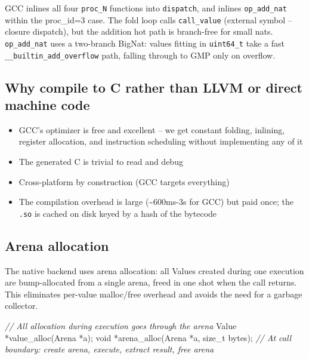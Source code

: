 \documentclass[]{article}
\newenvironment{Shaded}{}{}
\newcommand{\CommentTok}[1]{\textcolor[rgb]{0.38,0.63,0.69}{\textit{#1}}}
\newcommand{\DataTypeTok}[1]{\textcolor[rgb]{0.56,0.13,0.00}{#1}}
\newcommand{\NormalTok}[1]{#1}
\newcommand{\OperatorTok}[1]{\textcolor[rgb]{0.40,0.40,0.40}{#1}}
\begin{document}
GCC inlines all four \texttt{proc\_N} functions into \texttt{dispatch}, and
inlines \texttt{op\_add\_nat} within the proc\_id=3 case. The fold loop calls
\texttt{call\_value} (external symbol -- closure dispatch), but the addition hot
path is branch-free for small nats. \texttt{op\_add\_nat} uses a two-branch
BigNat: values fitting in \texttt{uint64\_t} take a fast
\texttt{\_\_builtin\_add\_overflow} path, falling through to GMP only on
overflow.

\subsection{Why compile to C rather than LLVM or direct machine
code}\label{why-compile-to-c-rather-than-llvm-or-direct-machine-code}

\begin{itemize}
\tightlist
\item
  GCC's optimizer is free and excellent -- we get constant folding, inlining,
  register allocation, and instruction scheduling without implementing any of it
\item
  The generated C is trivial to read and debug
\item
  Cross-platform by construction (GCC targets everything)
\item
  The compilation overhead is large (\textasciitilde600ms-3s for GCC) but paid
  once; the \texttt{.so} is cached on disk keyed by a hash of the bytecode
\end{itemize}

\subsection{Arena allocation}\label{arena-allocation}

The native backend uses arena allocation: all Values created during one
execution are bump-allocated from a single arena, freed in one shot when the
call returns. This eliminates per-value malloc/free overhead and avoids the need
for a garbage collector.

\begin{Shaded}
\begin{Highlighting}[]
\CommentTok{// All allocation during execution goes through the arena}
\NormalTok{Value }\OperatorTok{*}\NormalTok{value\_alloc}\OperatorTok{(}\NormalTok{Arena }\OperatorTok{*}\NormalTok{a}\OperatorTok{);}
\DataTypeTok{void}  \OperatorTok{*}\NormalTok{arena\_alloc}\OperatorTok{(}\NormalTok{Arena }\OperatorTok{*}\NormalTok{a}\OperatorTok{,} \DataTypeTok{size\_t}\NormalTok{ bytes}\OperatorTok{);}
\CommentTok{// At call boundary: create arena, execute, extract result, free arena}
\end{Highlighting}
\end{Shaded}
\end{document}

